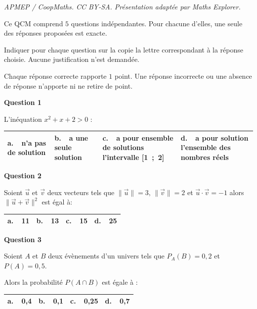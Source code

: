 \documentclass[10pt]{article}
\providecommand{\vect}[1]{\overrightarrow{#1}}
\begin{document}
\noindent\textit{APMEP / CoopMaths. CC BY-SA. Présentation adaptée par Maths Explorer.}\par\medskip
\medskip

Ce QCM comprend $5$ questions indépendantes. Pour chacune d'elles, une seule des réponses proposées est exacte.

Indiquer pour chaque question sur la copie la lettre correspondant à la réponse choisie. Aucune justification n'est demandée.

Chaque réponse correcte rapporte $1$ point. Une réponse incorrecte ou une absence de réponse n'apporte ni ne retire de point.

\medskip

\textbf{Question 1}

\medskip

L'inéquation $x^2 +x + 2 > 0$ :

\begin{center}
\begin{tabularx}{\linewidth}{|*{4}{X|}}\hline
\textbf{a.~~}n'a pas de solution&\textbf{b.~~}a une seule solution&\textbf{c.~~}a pour ensemble de solutions l'intervalle [1~;~2]&\textbf{d.~~}a pour solution l'ensemble des
 nombres réels\\ \hline
\end{tabularx}
\end{center}

\textbf{Question 2}

\medskip

Soient $\vect{u}$ et $\vect{v}$ deux vecteurs tels que $\|\vect{u}\|= 3,\,\|\vect{v}\|= 2$ et $\vect{u} \cdot \vect{v} = - 1$ alors $\|\vect{u} + \vect{v}\|^2$ est égal à:

\begin{center}
\begin{tabularx}{\linewidth}{|*{4}{X|}}\hline
\textbf{a.~~}11&\textbf{b.~~}13&\textbf{c.~~}15&\textbf{d.~~}25\\ \hline
\end{tabularx}
\end{center}

\textbf{Question 3}

\medskip

Soient $A$ et $B$ deux évènements d'un univers tels que $P_A(B) = 0,2$ et $P(A) = 0,5$.

 Alors la probabilité $P(A \cap B)$ est égale à :
 
\begin{center}
\begin{tabularx}{\linewidth}{|*{4}{X|}}\hline
\textbf{a.~~}0,4&\textbf{b.~~}0,1&\textbf{c.~~}0,25&\textbf{d.~~}0,7\\ \hline
\end{tabularx}
\end{center} 
\end{document}
